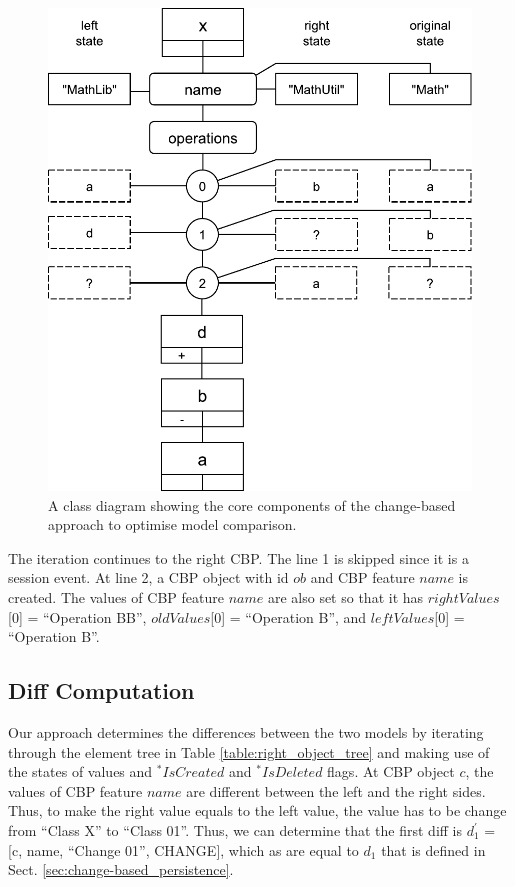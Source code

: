 \documentclass{llncs}
\begin{document}
\begin{figure}
    \vspace{-20pt}
    \includegraphics[width=\linewidth]{images/RightElementTreeDiagram}
    \caption{A class diagram showing the core components of the change-based approach to optimise model comparison.}
    \label{fig:right_element_tree_diagram}
\end{figure}

The iteration continues to the right CBP. The line 1 is skipped since it is a session event.  At line 2, a CBP object with id $ob$ and CBP feature $name$ is created. The values of CBP feature $name$ are also set so that it has $rightValues$[0] = ``Operation BB'', $oldValues$[0] = ``Operation B'', and $leftValues$[0] = ``Operation B''. 

\subsection{Diff Computation}
\label{sec:diff_computation}
Our approach determines the differences between the two models by iterating through the element tree in Table \ref{table:right_object_tree} and making use of the states of values and $^*IsCreated$ and $^*IsDeleted$ flags. At CBP object $c$, the values of CBP feature $name$ are different between the left and the right sides. Thus, to make the right value equals to the left value, the value has to be change from ``Class X'' to ``Class 01''. Thus, we can determine that the first diff is $d_1^\prime$ = [\textsf{c}, \textsf{name}, ``Change 01'', \textsf{CHANGE}], which as are equal to $d_1$ that is defined in Sect. \ref{sec:change-based_persistence}.
\end{document}
